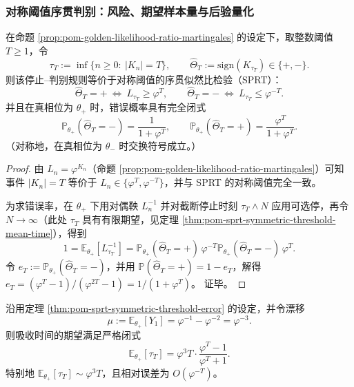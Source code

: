\subsubsection{对称阈值序贯判别：风险、期望样本量与后验量化}

\begin{theorem}\label{thm:pom-sprt-symmetric-threshold-error}
在命题 \ref{prop:pom-golden-likelihood-ratio-martingales} 的设定下，取整数阈值 \(T\ge 1\)，令
\[
\tau_T:=\inf\{n\ge 0:\ |K_n|=T\},\qquad
\widehat\Theta_T:=\mathrm{sign}(K_{\tau_T})\in\{+,-\}.
\]
则该停止--判别规则等价于对称阈值的序贯似然比检验（SPRT）：
\[
\widehat\Theta_T=+\ \Longleftrightarrow\ L_{\tau_T}\ge \varphi^T,\qquad
\widehat\Theta_T=-\ \Longleftrightarrow\ L_{\tau_T}\le \varphi^{-T}.
\]
并且在真相位为 \(\theta_+\) 时，错误概率具有完全闭式
\[
\boxed{\;
\mathbb{P}_{\theta_+}(\widehat\Theta_T=-)=\frac{1}{1+\varphi^{T}},\qquad
\mathbb{P}_{\theta_+}(\widehat\Theta_T=+)=\frac{\varphi^{T}}{1+\varphi^{T}}.\;}
\]
（对称地，在真相位为 \(\theta_-\) 时交换符号成立。）
\end{theorem}

\begin{proof}
由 \(L_n=\varphi^{K_n}\)（命题 \ref{prop:pom-golden-likelihood-ratio-martingales}）可知事件 \(|K_n|=T\) 等价于 \(L_n\in\{\varphi^{T},\varphi^{-T}\}\)，并与 SPRT 的对称阈值完全一致。
\par
为求错误率，在 \(\theta_+\) 下用对偶鞅 \(L_n^{-1}\) 并对截断停止时刻 \(\tau_T\wedge N\) 应用可选停，再令 \(N\to\infty\)（此处 \(\tau_T\) 具有有限期望，见定理 \ref{thm:pom-sprt-symmetric-threshold-mean-time}），得到
\[
1=\mathbb{E}_{\theta_+}[L_{\tau_T}^{-1}]
=\mathbb{P}_{\theta_+}(\widehat\Theta_T=+)\,\varphi^{-T}
\mathbb{P}_{\theta_+}(\widehat\Theta_T=-)\,\varphi^{T}.
\]
令 \(e_T:=\mathbb{P}_{\theta_+}(\widehat\Theta_T=-)\)，并用 \(\mathbb{P}(\widehat\Theta_T=+)=1-e_T\)，解得
\(
e_T=(\varphi^{T}-1)/(\varphi^{2T}-1)=1/(1+\varphi^{T})
\)。
证毕。
\end{proof}

\begin{theorem}\label{thm:pom-sprt-symmetric-threshold-mean-time}
沿用定理 \ref{thm:pom-sprt-symmetric-threshold-error} 的设定，并令漂移
\[
\mu:=\mathbb{E}_{\theta_+}[Y_1]=\varphi^{-1}-\varphi^{-2}=\varphi^{-3}.
\]
则吸收时间的期望满足严格闭式
\[
\boxed{\;
\mathbb{E}_{\theta_+}[\tau_T]
=\varphi^{3}T\cdot\frac{\varphi^{T}-1}{\varphi^{T}+1}.\;}
\]
特别地 \(\mathbb{E}_{\theta_+}[\tau_T]\sim \varphi^{3}T\)，且相对误差为 \(O(\varphi^{-T})\)。
\end{theorem}

